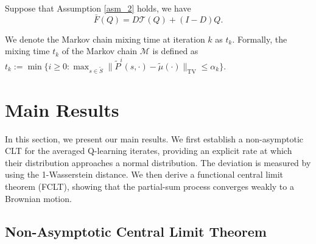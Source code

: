 \documentclass{opt2025} %
\begin{document}
\begin{lemma} Suppose that Assumption \ref{asm_2} holds, we have
$$\bar{F}(Q) = D \mathcal{T}(Q) + (I-D) Q.$$
\end{lemma}
We denote the Markov chain mixing time at iteration $k$ as $t_k$. Formally, the mixing time $t_k$ of the Markov chain $\mathcal{M}$ is defined as $t_k := \min \{ i\geq0: \max_{s\in\tilde{S}} \|\tilde{P}^{i}(s,\cdot) - \tilde{\mu}(\cdot) \|_{\text{TV}} \leq \alpha_k \}$.



\section{Main Results}
\label{sec_main}

In this section, we present our main results. We first establish a non-asymptotic CLT for the averaged Q-learning iterates, providing an explicit rate at which their distribution approaches a normal distribution. The deviation is measured by using the 1-Wasserstein distance. We then derive a functional central limit theorem (FCLT), showing that the partial-sum process converges weakly to a Brownian motion. 


\subsection{Non-Asymptotic Central Limit Theorem}
\end{document}
